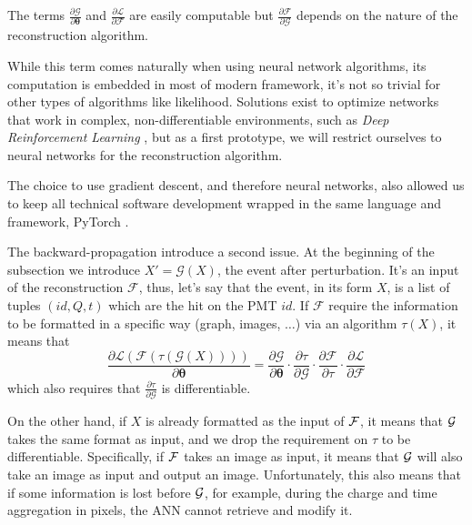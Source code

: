 \documentclass[../main.tex]{subfiles}
\begin{document}
The terms $\frac{\partial \mathcal{G}}{\partial \bm{\theta}}$ and $\frac{\partial \mathcal{L}}{\partial \mathcal{F}}$ are easily computable but $\frac{\partial \mathcal{F}}{\partial \mathcal{G}}$ depends on the nature of the reconstruction algorithm.


While this term comes naturally when using neural network algorithms, its computation is embedded in most of modern framework, it's not so trivial for other types of algorithms like likelihood. Solutions exist to optimize networks that work in complex, non-differentiable environments, such as \textit{Deep Reinforcement Learning} \cite{kiran_deep_2021, vinyals_grandmaster_2019}, but as a first prototype, we will restrict ourselves to neural networks for the reconstruction algorithm.

The choice to use gradient descent, and therefore neural networks, also allowed us to keep all technical software development wrapped in the same language and framework, PyTorch \cite{ansel_pytorch_2024}.

The backward-propagation introduce a second issue. At the beginning of the subsection we introduce $X' = \mathcal{G}(X)$, the event after perturbation. It's an input of the reconstruction $\mathcal{F}$, thus, let's say that the event, in its form $X$, is a list of tuples $(id, Q, t)$ which are the hit on the PMT $id$. If $\mathcal{F}$ require the information to be formatted in a specific way (graph, images, $\ldots$) via an algorithm $\tau(X)$, it means that
\begin{equation}
  \frac{\partial \mathcal{L}(\mathcal{F}(\tau(\mathcal{G}(X))))}{\partial \bm{\theta}} = \frac{\partial \mathcal{G}}{\partial \bm{\theta}} \cdot \frac{\partial \tau}{\partial \mathcal{G}} \cdot \frac{\partial \mathcal{F}}{\partial \tau} \cdot \frac{\partial \mathcal{L}}{\partial \mathcal{F}}
\end{equation}
which also requires that $\frac{\partial \tau}{\partial \mathcal{G}}$ is differentiable.

On the other hand, if $X$ is already formatted as the input of ${\cal F}$, it means that ${\cal G}$ takes the same format as input, and we drop the requirement on $\tau$ to be differentiable. Specifically, if ${\cal F}$ takes an image as input, it means that ${\cal G}$ will also take an image as input and output an image. Unfortunately, this also means that if some information is lost before ${\cal G}$, for example, during the charge and time aggregation in pixels, the ANN cannot retrieve and modify it.
\end{document}
